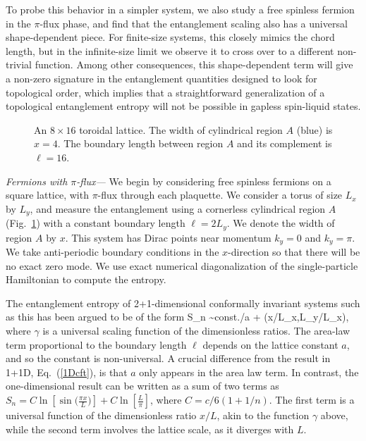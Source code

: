 \documentclass[prl,aps,twocolumn,floatfix,amsmath,amssymb,superscriptaddress,tightenlines]{revtex4}
\begin{document}
To probe this behavior in a simpler system, we also study
a free spinless fermion in the $\pi$-flux phase, and find that the entanglement scaling also has a universal shape-dependent piece.
For finite-size systems, this closely mimics the chord length, but in the infinite-size limit we observe it to cross over to a different non-trivial function.
Among other consequences, this shape-dependent term will give a non-zero signature in the entanglement quantities \cite{KP,LW} designed to look for topological order, which implies that a straightforward generalization of a topological entanglement entropy will not be possible in gapless spin-liquid states. 
 
  \begin{figure}
   \begin{center}
   \end{center}
   \caption{An $8 \times 16$ toroidal lattice.  The width of cylindrical region $A$ (blue) is $x=4$.  The boundary length between region $A$ and its complement is $\ell = 16$. }
   \label{fig:torus}
 \end{figure}
 
{\it Fermions with $\pi$-flux---}
We begin by considering
free spinless fermions on a square lattice, with $\pi$-flux through each plaquette.  We consider a torus of size $L_x$ by $L_y$, and
measure the entanglement %
using a cornerless cylindrical region $A$ (Fig.~\ref{fig:torus}) with a constant boundary length $\ell = 2L_y$.
We denote the width of region $A$ by $x$.
This system has Dirac points near momentum $k_y=0$ and $k_y=\pi$.  We take anti-periodic boundary conditions in the $x$-direction so that there will be no exact zero mode.  We use exact numerical diagonalization of the single-particle Hamiltonian to compute the entropy.

The entanglement entropy of 2+1-dimensional conformally invariant systems such as this has been argued to be of the form \cite{ryu,ZGV}
\be
S_n \sim {\rm const.}\times \ell /a + \gamma(x/L_x,L_y/L_x),
\ee
where $\gamma$ is a universal scaling function of the dimensionless ratios.
The area-law term proportional to the boundary length $\ell$ depends on the lattice constant $a$, and so the constant is non-universal. A crucial difference
from the result in 1+1D, Eq.~(\ref{1Dcft}), is that $a$ only appears in the area law term.  In contrast, the one-dimensional result can be written as a sum of two terms as
$S_n =C \ln[\sin\big( \frac{\pi x}{L} \big)]+ C\ln[\frac{L}{\pi}] $, where $C=c/6(1+1/n)$.
The first term is a universal function of the dimensionless ratio $x/L$, akin to the function $\gamma$ above, while the second term involves the lattice scale, as it diverges with $L$.
\end{document}

